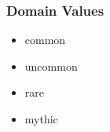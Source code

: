 \documentclass{article}
\begin{document}
\subsubsection{Domain Values}
\begin{multicols}{3}
    \begin{itemize}
            \item common
            \item uncommon
            \item rare
            \item mythic
    \end{itemize}
\end{multicols}
\end{document}
